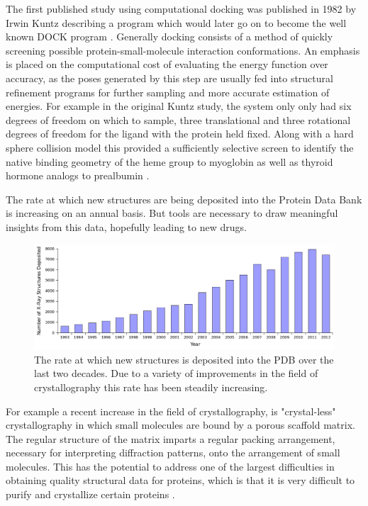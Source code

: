 The first published study using computational docking was published in 1982 by Irwin Kuntz describing a program which would later go on to become the well known DOCK program \cite{kuntz1982geometric}.
Generally docking consists of a method of quickly screening possible protein-small-molecule interaction conformations.
An emphasis is placed on the computational cost of evaluating the energy function over accuracy, as the poses generated by this step are usually fed into structural refinement programs for further sampling and more accurate estimation of energies.
For example in the original Kuntz study, the system only only had six degrees of freedom on which to sample, three translational and three rotational degrees of freedom for the ligand with the protein held fixed.
Along with a hard sphere collision model this provided a sufficiently selective screen to identify the native binding geometry of the heme group to myoglobin as well as thyroid hormone analogs to prealbumin \cite{kuntz1982geometric}.

The rate at which new structures are being deposited into the Protein Data Bank is increasing on an annual basis.
But tools are necessary to draw meaningful insights from this data, hopefully leading to new drugs.
\begin{figure}[H]
\begin{center}
\includegraphics[width=\textwidth]{figures/pdb_deposit_rate.png}
\caption{The rate at which new structures is deposited into the PDB over the last two decades.
Due to a variety of improvements in the field of crystallography this rate has been steadily increasing.}
\label{figure:pdb_growth}
\end{center}
\end{figure}

For example a recent increase in the field of crystallography, is "crystal-less" crystallography in which small molecules are bound by a porous scaffold matrix.
The regular structure of the matrix imparts a regular packing arrangement, necessary for interpreting diffraction patterns, onto the arrangement of small molecules.
This has the potential to address one of the largest difficulties in obtaining quality structural data for proteins, which is that it is very difficult to purify and crystallize certain proteins \cite{inokuma2013x}.

